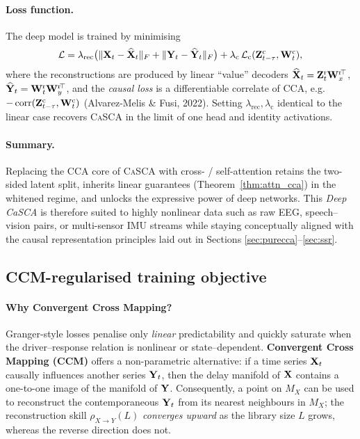 \documentclass[14pt]{extarticle}
\begin{document}
	\paragraph{Loss function.}
	The deep model is trained by minimising
	\[
	\mathcal L
	=
	\lambda_{\mathrm{rec}}
	\bigl(
	\|\mathbf{X}_t-\widehat{\mathbf{X}}_t\|_F
	+
	\|\mathbf{Y}_t-\widehat{\mathbf{Y}}_t\|_F
	\bigr)
	+
	\lambda_{\mathrm{c}}
	\,\mathcal L_{\mathrm{c}}(\mathbf{Z}_{t-\tau}^{\mathrm c},\mathbf{W}_t^{\mathrm c}),
	\]
	where the reconstructions are produced by linear “value” decoders
	\(\widehat{\mathbf{X}}_t=\mathbf{Z}_t^{\mathrm r}\mathbf{W}_{x}^{\mathrm r\!\top}\),
	\(\widehat{\mathbf{Y}}_t=\mathbf{W}_t^{\mathrm r}\mathbf{W}_{y}^{\mathrm r\!\top}\),
	and the \emph{causal loss} is a differentiable correlate of CCA,
	e.g.\ \(-\operatorname{corr}(\mathbf{Z}_{t-\tau}^{\mathrm c},\mathbf{W}_t^{\mathrm c})\)
	(Alvarez‐Melis \& Fusi, 2022).
	Setting \(\lambda_{\mathrm{rec}},\lambda_{\mathrm{c}}\) identical to the
	linear case recovers \textsc{CaSCA} in the limit of one head and
	identity activations.
	
	\paragraph{Summary.}
	Replacing the CCA core of \textsc{CaSCA} with cross- / self-attention
	retains the two-sided latent split, inherits linear guarantees
	(Theorem~\ref{thm:attn_cca}) in the whitened regime, and unlocks the
	expressive power of deep networks.
	This \emph{Deep CaSCA} is therefore suited to highly nonlinear data
	such as raw EEG, speech–vision pairs, or multi-sensor IMU streams while
	staying conceptually aligned with the causal representation principles
	laid out in Sections \ref{sec:purecca}–\ref{sec:ssr}.
	
	\subsection{CCM-regularised training objective}
	\label{sec:ccm_reg}
	
	\paragraph{Why Convergent Cross Mapping?}
	Granger-style losses penalise only \emph{linear} predictability and
	quickly saturate when the driver–response relation is nonlinear or
	state–dependent.
	\textbf{Convergent Cross Mapping (CCM)} \citep{Sugihara2012} offers a
	non-parametric alternative: if a time series
	$\mathbf{X}_t$ causally influences another series $\mathbf{Y}_t$, then the delay
	manifold of $\mathbf{X}$ contains a one-to-one image of the manifold of $\mathbf{Y}$.
	Consequently, a point on $M_X$ can be used to reconstruct the
	contemporaneous $\mathbf{Y}_t$ from its nearest neighbours in $M_X$;
	the reconstruction skill
	$\rho_{X\to Y}(L)$ \emph{converges upward} as the library size
	$L$ grows, whereas the reverse direction does not.
	
\end{document}
